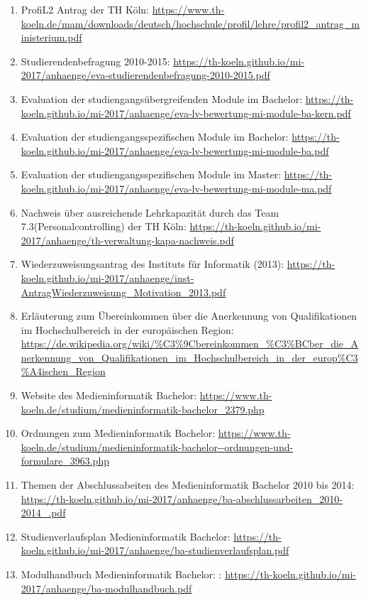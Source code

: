 \documentclass[BCOR12mm,DIV11,titlepage,a4paper,oneside,10pt]{scrbook}
\begin{document}
\begin{sloppypar}
\begin{flushleft}
\begin{enumerate}
\item{ProfiL2 Antrag der TH Köln: \url{https://www.th-koeln.de/mam/downloads/deutsch/hochschule/profil/lehre/profil2\_antrag\_ministerium.pdf} } 
\item{Studierendenbefragung 2010-2015: \url{https://th-koeln.github.io/mi-2017/anhaenge/eva-studierendenbefragung-2010-2015.pdf} } 
\item{Evaluation der studiengangsübergreifenden Module im Bachelor: \url{https://th-koeln.github.io/mi-2017/anhaenge/eva-lv-bewertung-mi-module-ba-kern.pdf} } 
\item{Evaluation der studiengangsspezifischen Module im Bachelor: \url{https://th-koeln.github.io/mi-2017/anhaenge/eva-lv-bewertung-mi-module-ba.pdf} } 
\item{Evaluation der studiengangsspezifischen Module im Master: \url{https://th-koeln.github.io/mi-2017/anhaenge/eva-lv-bewertung-mi-module-ma.pdf} } 
\item{Nachweis über ausreichende Lehrkapazität durch das Team 7.3(Personalcontrolling) der TH Köln: \url{https://th-koeln.github.io/mi-2017/anhaenge/th-verwaltung-kapa-nachweis.pdf} } 
\item{Wiederzuweisungsantrag des Instituts für Informatik (2013): \url{https://th-koeln.github.io/mi-2017/anhaenge/inst-AntragWiederzuweisung\_Motivation\_2013.pdf} } 
\item{Erläuterung zum Übereinkommen über die Anerkennung von Qualifikationen im Hochschulbereich in der europäischen Region: \url{https://de.wikipedia.org/wiki/\%C3\%9Cbereinkommen\_\%C3\%BCber\_die\_Anerkennung\_von\_Qualifikationen\_im\_Hochschulbereich\_in\_der\_europ\%C3\%A4ischen\_Region} } 
\item{Website des Medieninformatik Bachelor: \url{https://www.th-koeln.de/studium/medieninformatik-bachelor\_2379.php} } 
\item{Ordnungen zum Medieninformatik Bachelor: \url{https://www.th-koeln.de/studium/medieninformatik-bachelor--ordnungen-und-formulare\_3963.php} } 
\item{Themen der Abschlussabeiten des Medieninformatik Bachelor 2010 bis 2014: \url{https://th-koeln.github.io/mi-2017/anhaenge/ba-abschlussarbeiten\_2010-2014\_.pdf} } 
\item{Studienverlaufsplan Medieninformatik Bachelor: \url{https://th-koeln.github.io/mi-2017/anhaenge/ba-studienverlaufsplan.pdf} } 
\item{Modulhandbuch Medieninformatik Bachelor: : \url{https://th-koeln.github.io/mi-2017/anhaenge/ba-modulhandbuch.pdf} } 

\end{enumerate}
\end{flushleft}
\end{sloppypar}
\end{document}

